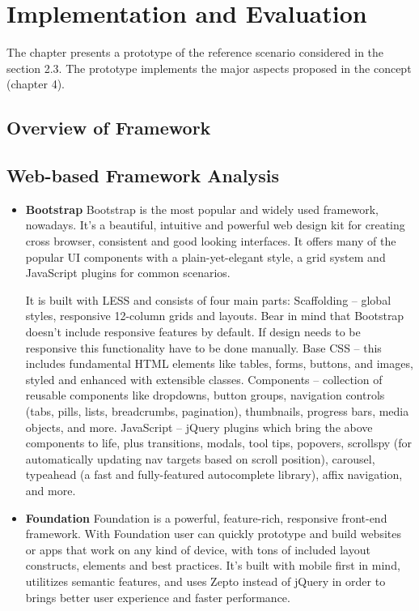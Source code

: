 \chapter{Implementation and Evaluation}
The chapter presents a prototype of the reference scenario considered in the section
2.3. The prototype implements the major aspects proposed in the concept (chapter
4).
\section{Overview of Framework}
\section{Web-based Framework Analysis}
 \begin{itemize}
\item \textbf{Bootstrap}
\newline
Bootstrap is the most popular and widely used framework, nowadays. It’s a beautiful, intuitive and powerful web design kit for creating cross browser, consistent and good looking interfaces. It offers many of the popular UI components with a plain-yet-elegant style, a grid system and JavaScript plugins for common scenarios.

It is built with LESS and consists of four main parts:
Scaffolding – global styles, responsive 12-column grids and layouts. Bear in mind that Bootstrap doesn’t include responsive features by default. If design needs to be responsive this functionality have to be done manually.
Base CSS – this includes fundamental HTML elements like tables, forms, buttons, and images, styled and enhanced with extensible classes.
Components – collection of reusable components like dropdowns, button groups, navigation controls (tabs, pills, lists, breadcrumbs, pagination), thumbnails, progress bars, media objects, and more.
JavaScript – jQuery plugins which bring the above components to life, plus transitions, modals, tool tips, popovers, scrollspy (for automatically updating nav targets based on scroll position), carousel, typeahead (a fast and fully-featured autocomplete library), affix navigation, and more.
\item \textbf{Foundation}
\newline
Foundation is a powerful, feature-rich, responsive front-end framework. With Foundation user can quickly prototype and build websites or apps that work on any kind of device, with tons of included layout constructs, elements and best practices. It’s built with mobile first in mind, utilitizes semantic features, and uses Zepto instead of jQuery in order to brings better user experience and faster performance.


\end{itemize}
